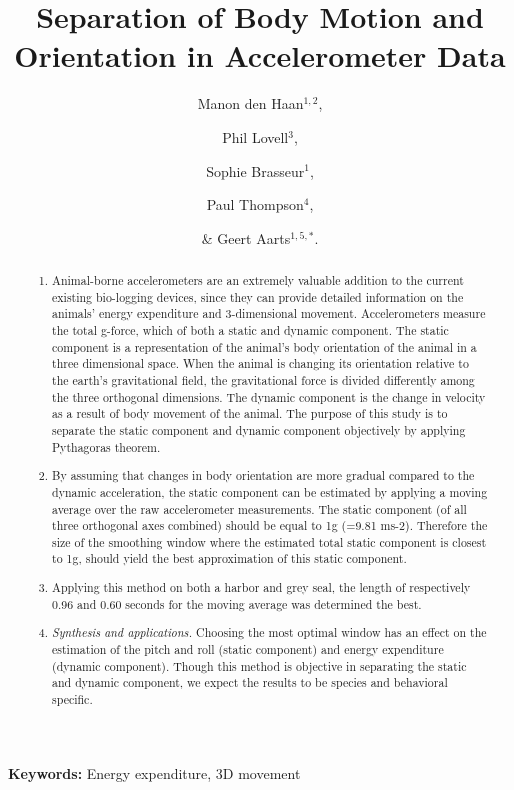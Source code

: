 \documentclass[a4paper,12pt]{article}
\title{Separation of Body Motion and Orientation in Accelerometer Data}
\author{Manon den Haan$^{1,2}$, \and Phil Lovell$^{3}$, \and Sophie Brasseur$^{1}$, \and
  Paul Thompson$^{4}$, \and \& Geert Aarts$^{1,5,*}$.}
\begin{document}
\maketitle


\begin{abstract}
  \noindent \begin{enumerate}
  \item Animal-borne accelerometers are an extremely valuable addition to the current existing bio-logging devices, since they can provide detailed information on the animals’ energy expenditure and 3-dimensional movement. Accelerometers measure the total g-force, which \consists of both a static and dynamic component. The static component is a representation of the animal’s body orientation of the animal in a three dimensional space. When the animal is changing its orientation relative to the earth’s gravitational field, the gravitational force is divided differently among the three orthogonal dimensions. The dynamic component is the change in velocity as a result of body movement of the animal. The purpose of this study is to separate the static component and dynamic component objectively by applying Pythagoras theorem. 
  \item By assuming that changes in body orientation are more gradual compared to the dynamic acceleration, the static component can be estimated by applying a moving average over the raw accelerometer measurements. The static component (of all three orthogonal axes combined) should be equal to 1g (=9.81 ms-2). Therefore the size of the smoothing window where the estimated total static component is closest to 1g, should yield the best approximation of this static component. 
  \item Applying this method on both a harbor and grey seal, the length of respectively 0.96 and 0.60 seconds for the moving average was determined the best. 
  \item \emph{Synthesis and applications.} Choosing the most optimal window has an effect on the estimation of the pitch and roll (static component) and energy expenditure (dynamic component). Though this method is objective in separating the static and dynamic component, we expect the results to be species and behavioral specific.
  \end{enumerate}
\end{abstract}

\noindent \textbf{Keywords:} Energy expenditure, 3D movement
\end{document}
